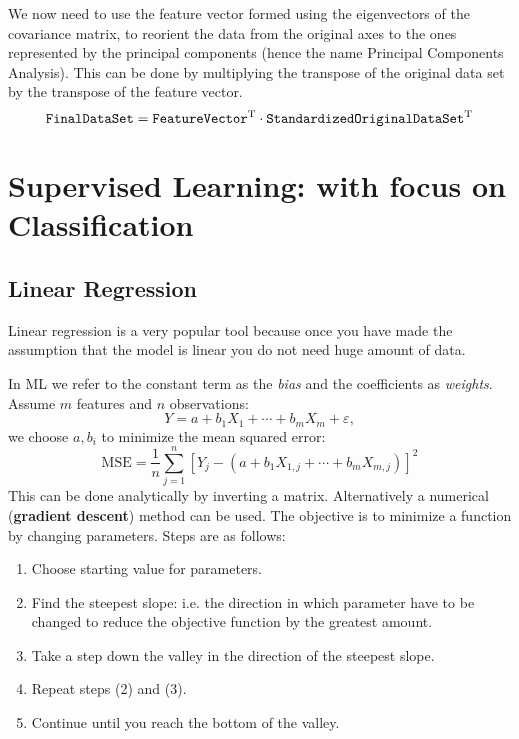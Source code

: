 We now need to use the feature vector formed using the eigenvectors of the covariance matrix, to reorient the data from the original axes to the ones represented by the principal components (hence the name Principal Components Analysis). This can be done by multiplying the transpose of the original data set by the transpose of the feature vector.
\begin{equation*}
    \texttt{FinalDataSet} =\texttt{FeatureVector}^{\mathrm{T}} \cdot \texttt{StandardizedOriginalDataSet}^{\mathrm{T}}
\end{equation*}

\section{Supervised Learning: with focus on Classification}

\subsection{Linear Regression}

Linear regression is a very popular tool because once you have made the assumption that the model is linear you do not need huge amount of data.

In ML we refer to the constant term as the \textit{bias} and the coefficients as \textit{weights}. Assume $m$ features and $n$ observations:
\begin{equation*}
    Y=a+b_{1} X_{1} +\cdots +b_{m} X_{m} +\varepsilon,
\end{equation*}
we choose $a,b_{i}$ to minimize the mean squared error:
\begin{equation*}
    \text{MSE}=\frac{1}{n}\sum _{j=1}^{n}[ Y_{j} -(a+b_{1} X_{1,j} +\cdots +b_{m} X_{m,j})]^{2}
\end{equation*}
This can be done analytically by inverting a matrix. Alternatively a numerical (\textbf{gradient descent}) method can be used. The objective is to minimize a function by changing parameters. Steps are as follows:
\begin{enumerate}
    \item Choose starting value for parameters.
    \item Find the steepest slope: i.e. the direction in which parameter have to be changed to reduce the objective function by the greatest amount.
    \item Take a step down the valley in the direction of the steepest slope.
    \item Repeat steps (2) and (3).
    \item Continue until you reach the bottom of the valley.
\end{enumerate}

